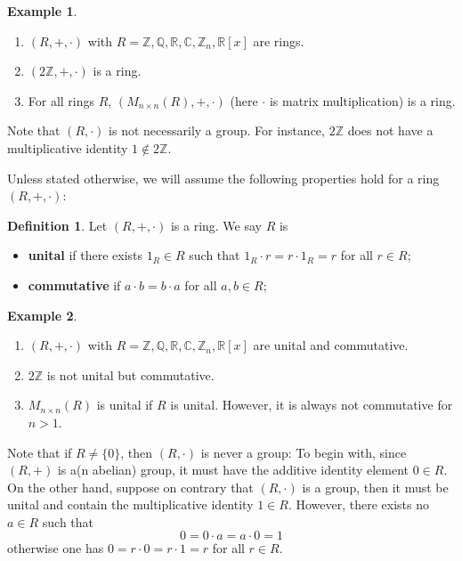 \documentclass[11pt,openany]{book}
\theoremstyle{plain}
\theoremstyle{definition}
\newtheorem{definition}[definition]{Definition}
\newtheorem{example}[example]{Example}
\theoremstyle{remark}
\begin{document}
\begin{example}
    \begin{enumerate}
        \item $(R,+,\cdot)$ with $R = \mathbb{Z}, \mathbb{Q}, \mathbb{R}, \mathbb{C}, \mathbb{Z}_n, \mathbb{R}[x]$ are rings.
        \item $(2\mathbb{Z},+,\cdot)$ is a ring.
        \item For all rings $R$, $(M_{n\times n}(R),+,\cdot)$ (here $\cdot$ is matrix multiplication) is a ring.
    \end{enumerate}
\end{example}

Note that $(R, \cdot)$ is not necessarily a group. For instance, $2\mathbb{Z}$ does not have a multiplicative identity $1 \notin 2\mathbb{Z}$. 

Unless stated otherwise, we will assume the following properties hold for a ring $(R,+,\cdot)$:
\begin{definition}
Let $(R,+,\cdot)$ is a ring. We say $R$ is 
\begin{itemize}
    \item {\bf unital} if there exists $1_R \in R$ such that $1_R\cdot r=r\cdot 1_R=r$ for all $r\in R$;
    \item {\bf commutative} if $a \cdot b = b \cdot a$ for all $a, b \in R$;
\end{itemize}
\end{definition}

\begin{example}\
\begin{enumerate}
    \item $(R,+,\cdot)$ with $R = \mathbb{Z}, \mathbb{Q}, \mathbb{R}, \mathbb{C}, \mathbb{Z}_n, \mathbb{R}[x]$ are unital and commutative.
    \item $2\mathbb{Z}$ is not unital but commutative.
    \item $M_{n\times n}(R)$ is unital if $R$ is unital. However, it is always not commutative for $n > 1$.
\end{enumerate}
\end{example}

Note that if $R \neq \{0\}$, then $(R,\cdot)$ is never a group: To begin with, since $(R,+)$ is a(n abelian) group, it must have the additive identity element $0 \in R$. On the other hand, suppose on contrary that $(R,\cdot)$ is a group, then it must be unital and contain the multiplicative identity $1 \in R$. However, there exists no $a \in R$ such that
$$0 = 0 \cdot a = a \cdot 0 = 1$$
otherwise one has $0 = r \cdot 0 = r \cdot 1 = r$ for all $r \in R$.
\end{document}
